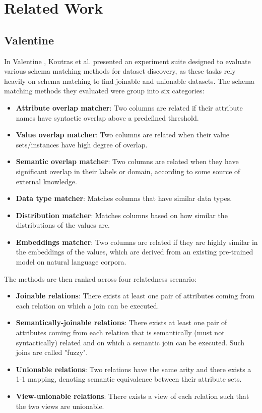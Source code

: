 


\chapter{Related Work}
\label{chap:relatedwork}
\pagestyle{plain}

\section{Valentine}

In Valentine \cite{valentine}, Koutras et al. presented an experiment suite designed to evaluate various schema matching methods for dataset discovery, as these tasks rely heavily on schema matching to find joinable and unionable datasets. The schema matching methods they evaluated were group into six categories:

\begin{itemize}
    \item \textbf{Attribute overlap matcher}: Two columns are related if their attribute names have syntactic overlap above a predefined threshold.
    \item \textbf{Value overlap matcher}: Two columns are related when their value sets/instances have high degree of overlap.
    \item \textbf{Semantic overlap matcher}: Two columns are related when they have significant overlap in their labels or domain, according to some source of external knowledge.
    \item \textbf{Data type matcher}: Matches columns that have similar data types.
    \item \textbf{Distribution matcher}: Matches columns based on how similar the distributions of the values are.
    \item \textbf{Embeddings matcher}: Two columns are related if they are highly similar in the embeddings of the values, which are derived from an existing pre-trained model on natural language corpora.
\end{itemize}

The methods are then ranked across four relatedness scenario:

\begin{itemize}
    \item \textbf{Joinable relations}: There exists at least one pair of attributes coming from each relation on which a join can be executed.
    \item \textbf{Semantically-joinable relations}: There exists at least one pair of attributes coming from each relation that is semantically (must not syntactically) related and on which a semantic join can be executed. Such joins are called "fuzzy".
    \item \textbf{Unionable relations}: Two relations have the same arity and there exists a 1-1 mapping, denoting semantic equivalence between their attribute sets.
    \item \textbf{View-unionable relations}: There exists a view of each relation such that the two views are unionable.
\end{itemize}

